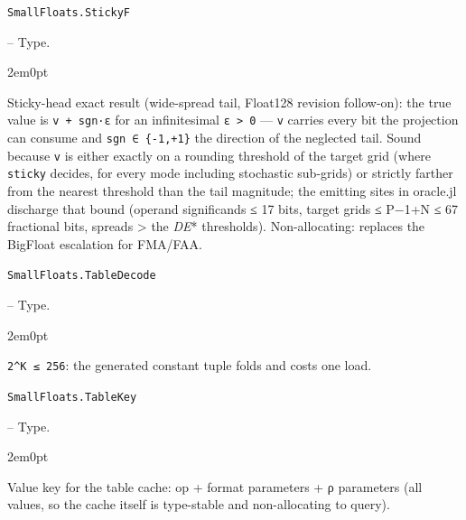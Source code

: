 \par\medskip\noindent\begin{minipage}{\linewidth}
\hypertarget{844750228189688156}{\texttt{SmallFloats.StickyF}}  -- {Type.}
\nopagebreak
\begin{adjustwidth}{2em}{0pt}

Sticky-head exact result (wide-spread tail, Float128 revision follow-on): the true value is \texttt{v + sgn·ε} for an infinitesimal \texttt{ε > 0} — \texttt{v} carries every bit the projection can consume and \texttt{sgn ∈ \{-1,+1\}} the direction of the neglected tail. Sound because \texttt{v} is either exactly on a rounding threshold of the target grid (where \texttt{sticky} decides, for every mode including stochastic sub-grids) or strictly farther from the nearest threshold than the tail magnitude; the emitting sites in oracle.jl discharge that bound (operand significands ≤ 17 bits, target grids ≤ P−1+N ≤ 67 fractional bits, spreads > the \emph{DE}* thresholds). Non-allocating: replaces the BigFloat escalation for FMA/FAA.



\end{adjustwidth}
\end{minipage}
\par\medskip

\par\medskip\noindent\begin{minipage}{\linewidth}
\hypertarget{12352230725331747513}{\texttt{SmallFloats.TableDecode}}  -- {Type.}
\nopagebreak
\begin{adjustwidth}{2em}{0pt}

\texttt{2{\textasciicircum}K ≤ 256}: the generated constant tuple folds and costs one load.



\end{adjustwidth}
\end{minipage}
\par\medskip

\par\medskip\noindent\begin{minipage}{\linewidth}
\hypertarget{245207806059811915}{\texttt{SmallFloats.TableKey}}  -- {Type.}
\nopagebreak
\begin{adjustwidth}{2em}{0pt}

Value key for the table cache: op + format parameters + ρ parameters (all values, so the cache itself is type-stable and non-allocating to query).



\end{adjustwidth}
\end{minipage}
\par\medskip

